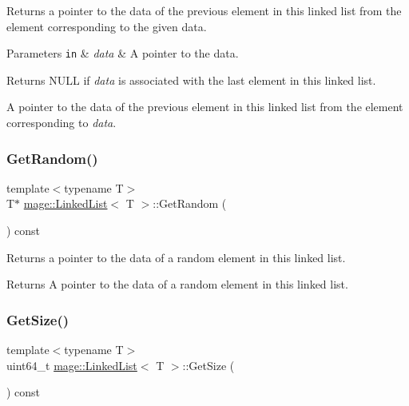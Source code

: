 Returns a pointer to the data of the previous element in this linked list from the element corresponding to the given data.


\begin{DoxyParams}[1]{Parameters}
\mbox{\tt in}  & {\em data} & A pointer to the data. \\
\hline
\end{DoxyParams}
\begin{DoxyReturn}{Returns}
{\ttfamily N\+U\+LL} if {\itshape data} is associated with the last element in this linked list. 

A pointer to the data of the previous element in this linked list from the element corresponding to {\itshape data}. 
\end{DoxyReturn}
\hypertarget{classmage_1_1_linked_list_aec571022e5fa10e0afea286e4427eb89}{}\label{classmage_1_1_linked_list_aec571022e5fa10e0afea286e4427eb89} 
\subsubsection{\texorpdfstring{Get\+Random()}{GetRandom()}}
{\footnotesize\ttfamily template$<$typename T$>$ \\
T$\ast$ \hyperlink{classmage_1_1_linked_list}{mage\+::\+Linked\+List}$<$ T $>$\+::Get\+Random (\begin{DoxyParamCaption}{ }\end{DoxyParamCaption}) const}

Returns a pointer to the data of a random element in this linked list.

\begin{DoxyReturn}{Returns}
A pointer to the data of a random element in this linked list. 
\end{DoxyReturn}
\hypertarget{classmage_1_1_linked_list_a8d033278680a0053e30cba91b27941a1}{}\label{classmage_1_1_linked_list_a8d033278680a0053e30cba91b27941a1} 
\subsubsection{\texorpdfstring{Get\+Size()}{GetSize()}}
{\footnotesize\ttfamily template$<$typename T$>$ \\
uint64\+\_\+t \hyperlink{classmage_1_1_linked_list}{mage\+::\+Linked\+List}$<$ T $>$\+::Get\+Size (\begin{DoxyParamCaption}{ }\end{DoxyParamCaption}) const}

